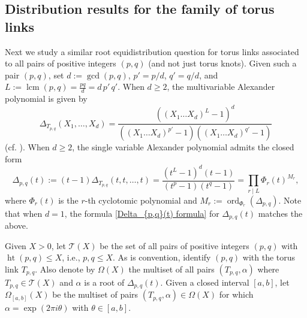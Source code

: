 \documentclass[table]{amsart}
\newcommand{\op}[1]{\operatorname{#1}}
\numberwithin{equation}{section}
\begin{document}
\subsection{Distribution results for the family of torus links}
\par Next we study a similar root equidistribution question for torus links associated to all pairs of positive integers $(p,q)$ (and not just torus knots). Given such a pair $(p,q)$, set \(d:=\gcd(p,q)\), \(p'=p/d\), \(q'=q/d\), and
$L:=\operatorname{lcm}(p,q)=\frac{pq}{d}=d\,p'\,q'$. When $d\geq 2$, the multivariable Alexander polynomial is given by 
\begin{equation}\label{MAP eqn}\Delta_{T_{p,q}}(X_1, \dots, X_d)=\frac{\left((X_1\dots X_d)^{L}-1\right)^d}{\left((X_1\dots X_d)^{p'}-1\right)\left((X_1\dots X_d)^{q'}-1\right)}\end{equation}
\noindent (cf. \cite[section 10.1]{Milnor}).
When $d\geq 2$, the single variable Alexander polynomial admits the closed form
\[
\Delta_{p,q}(t)
:=(t-1)\Delta_{T_{p,q}}(t, t, \dots, t)= \frac{(t^{L}-1)^{d}(t-1)}{(t^{p}-1)(t^{q}-1)}=\prod_{r\mid L}\Phi_r(t)^{M_r},
\]
where $\Phi_r(t)$ is the $r$-th cyclotomic polynomial and $M_r:=\operatorname{ord}_{\Phi_r}(\Delta_{p,q})$. Note that when $d=1$, the formula \eqref{Delta_{p,q}(t) formula} for $\Delta_{p,q}(t)$ matches the above.

\par Given $X>0$, let $\mathcal{T}(X)$ be the set of all pairs of positive integers $(p,q)$ with $\op{ht}(p,q)\leq X$, i.e., $p, q\leq X$. As is convention, identify $(p,q)$ with the torus link $T_{p,q}$. Also denote by $\Omega(X)$ the multiset of all pairs $(T_{p,q}, \alpha)$ where $T_{p,q}\in \mathcal{T}(X)$ and $\alpha$ is a root of $\Delta_{p,q}(t)$. Given a closed interval $[a,b]$, let $\Omega_{[a,b]}(X)$ be the multiset of pairs $(T_{p,q}, \alpha)\in \Omega(X)$ for which $\alpha=\op{exp}(2\pi i \theta)$ with $\theta\in [a,b]$. 
\end{document}
